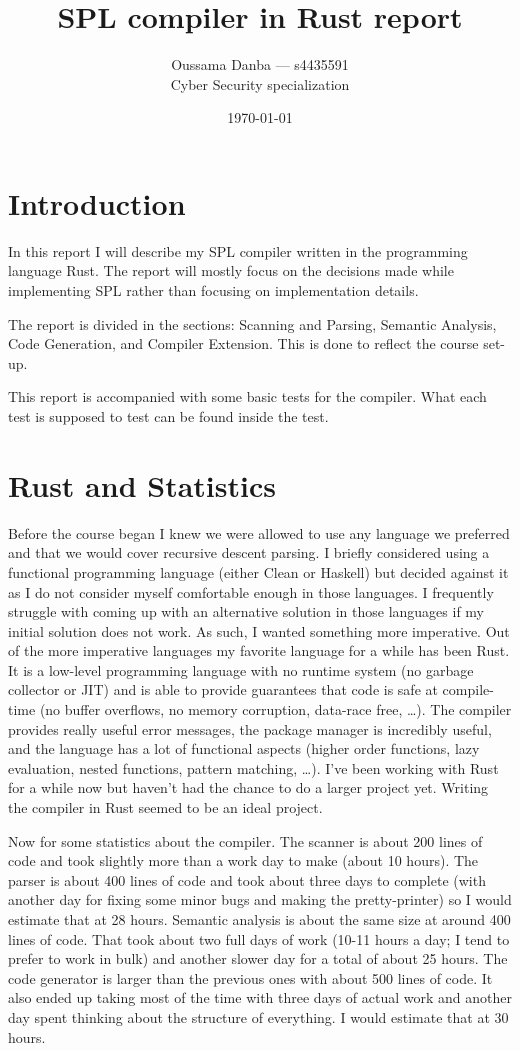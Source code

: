 \documentclass{article}
\title{SPL compiler in Rust report}
\author{Oussama Danba --- s4435591\\Cyber Security specialization}
\date{\today}
\begin{document}
\maketitle

\section{Introduction}
In this report I will describe my SPL compiler written in the programming language Rust. The report will mostly focus on the decisions made while implementing SPL rather than focusing on implementation details.

The report is divided in the sections: Scanning and Parsing, Semantic Analysis, Code Generation, and Compiler Extension. This is done to reflect the course set-up.

This report is accompanied with some basic tests for the compiler. What each test is supposed to test can be found inside the test.

\section{Rust and Statistics}
Before the course began I knew we were allowed to use any language we preferred and that we would cover recursive descent parsing. I briefly considered using a functional programming language (either Clean or Haskell) but decided against it as I do not consider myself comfortable enough in those languages. I frequently struggle with coming up with an alternative solution in those languages if my initial solution does not work. As such, I wanted something more imperative. Out of the more imperative languages my favorite language for a while has been Rust. It is a low-level programming language with no runtime system (no garbage collector or JIT) and is able to provide guarantees that code is safe at compile-time (no buffer overflows, no memory corruption, data-race free, \dots). The compiler provides really useful error messages, the package manager is incredibly useful, and the language has a lot of functional aspects (higher order functions, lazy evaluation, nested functions, pattern matching, \dots). I've been working with Rust for a while now but haven't had the chance to do a larger project yet. Writing the compiler in Rust seemed to be an ideal project.

Now for some statistics about the compiler. The scanner is about 200 lines of code and took slightly more than a work day to make (about 10 hours). The parser is about 400 lines of code and took about three days to complete (with another day for fixing some minor bugs and making the pretty-printer) so I would estimate that at 28 hours. Semantic analysis is about the same size at around 400 lines of code. That took about two full days of work (10-11 hours a day; I tend to prefer to work in bulk) and another slower day for a total of about 25 hours. The code generator is larger than the previous ones with about 500 lines of code. It also ended up taking most of the time with three days of actual work and another day spent thinking about the structure of everything. I would estimate that at 30 hours.
\end{document}
